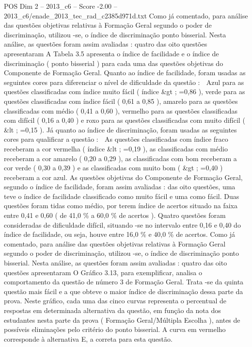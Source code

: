 \begin{textsample}{POS Dim 2 – 2013\_c6 – Score -2.00 – 2013\_c6/enade\_2013\_tec\_rad\_c2385d971d.txt}
Como já comentado, para análise das questões objetivas relativas à Formação Geral segundo o poder de discriminação, utilizou -se, o índice de discriminação ponto bisserial.
Nesta análise, as questões foram assim avaliadas : quatro das oito questões apresentaram A Tabela 3.5 apresenta o índice de facilidade e o índice de discriminação ( ponto bisserial ) para cada uma das questões objetivas do Componente de Formação Geral.
Quanto ao índice de facilidade, foram usadas as seguintes cores para diferenciar o nível de dificuldade da questão :  Azul para as questões classificadas com índice muito fácil ( índice \&gt ; =0,86 ), verde para as questões classificadas com índice fácil ( 0,61 a 0,85 ), amarelo para as questões classificadas com médio ( 0,41 a 0,60 ), vermelho para as questões classificadas com difícil ( 0,16 a 0,40 ) e roxo para as questões classificadas com muito difícil ( \&lt ; =0,15 ).
Já quanto ao índice de discriminação, foram usadas as seguintes cores para qualificar a questão :  As questões classificadas com índice fraco receberam a cor vermelha ( índice \&lt ; =0,19 ), as classificadas com médio receberam a cor amarelo ( 0,20 a 0,29 ), as classificadas com bom receberam a cor verde ( 0,30 a 0,39 ) e as classificadas com muito bom ( \&gt ; =0,40 ) receberam a cor azul.
As questões objetivas do Componente de Formação Geral, segundo o índice de facilidade, foram assim avaliadas : das oito questões, uma teve o índice de facilidade classificado como muito fácil e uma como fácil.
Duas questões foram tidas como médio, por terem índice de acertos situado na faixa entre 0,41 e 0,60 ( de 41,0 \% a 60,0 \% de acertos ).
Quatro questões foram consideradas de dificuldade difícil, situando -se no intervalo entre 0,16 e 0,40 do índice de facilidade, ou seja, houve entre 16,0 \% e 40,0 \% de acertos.
Como já comentado, para análise das questões objetivas relativas à Formação Geral segundo o poder de discriminação, utilizou -se, o índice de discriminação ponto bisserial.
Nesta análise, as questões foram assim avaliadas : quatro das oito questões apresentaram O Gráfico 3.13, para exemplificar, analisa o comportamento da questão de número 3 de Formação Geral.
Trata -se da quinta questão mais fácil e a que obteve o maior índice de discriminação dessa parte da prova.
Neste gráfico, cada uma das cinco curvas representa o percentual de respostas em determinada alternativa da questão, em função da nota dos estudantes nesta parte da prova ( Formação Geral/Múltipla Escolha ), antes de possíveis eliminações pelo critério do ponto bisserial.
A curva em vermelho corresponde à alternativa E, a correta para esta questão.

\end{textsample}
